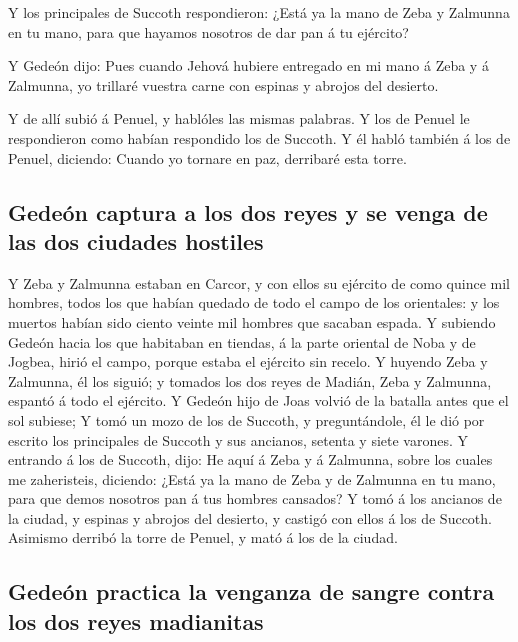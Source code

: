  Y los principales de Succoth respondieron: ¿Está ya la mano
de Zeba y Zalmunna en tu mano, para que hayamos nosotros de dar pan á tu
ejército?

 Y Gedeón dijo: Pues cuando Jehová hubiere entregado en mi
mano á Zeba y á Zalmunna, yo trillaré vuestra carne con espinas y
abrojos del desierto.

 Y de allí subió á Penuel, y hablóles las mismas palabras. Y
los de Penuel le respondieron como habían respondido los de Succoth.
 Y él habló también á los de Penuel, diciendo: Cuando yo
tornare en paz, derribaré esta torre.

\hypertarget{gedeuxf3n-captura-a-los-dos-reyes-y-se-venga-de-las-dos-ciudades-hostiles}{%
\subsection{Gedeón captura a los dos reyes y se venga de las dos
ciudades
hostiles}\label{gedeuxf3n-captura-a-los-dos-reyes-y-se-venga-de-las-dos-ciudades-hostiles}}

 Y Zeba y Zalmunna estaban en Carcor, y con ellos su
ejército de como quince mil hombres, todos los que habían quedado de
todo el campo de los orientales: y los muertos habían sido ciento veinte
mil hombres que sacaban espada.  Y subiendo Gedeón hacia
los que habitaban en tiendas, á la parte oriental de Noba y de Jogbea,
hirió el campo, porque estaba el ejército sin recelo.  Y
huyendo Zeba y Zalmunna, él los siguió; y tomados los dos reyes de
Madián, Zeba y Zalmunna, espantó á todo el ejército.  Y
Gedeón hijo de Joas volvió de la batalla antes que el sol subiese;
 Y tomó un mozo de los de Succoth, y preguntándole, él le
dió por escrito los principales de Succoth y sus ancianos, setenta y
siete varones.  Y entrando á los de Succoth, dijo: He aquí
á Zeba y á Zalmunna, sobre los cuales me zaheristeis, diciendo: ¿Está ya
la mano de Zeba y de Zalmunna en tu mano, para que demos nosotros pan á
tus hombres cansados?  Y tomó á los ancianos de la ciudad,
y espinas y abrojos del desierto, y castigó con ellos á los de Succoth.
 Asimismo derribó la torre de Penuel, y mató á los de la
ciudad.

\hypertarget{gedeuxf3n-practica-la-venganza-de-sangre-contra-los-dos-reyes-madianitas}{%
\subsection{Gedeón practica la venganza de sangre contra los dos reyes
madianitas}\label{gedeuxf3n-practica-la-venganza-de-sangre-contra-los-dos-reyes-madianitas}}

